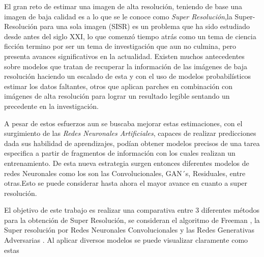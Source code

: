 
El gran reto de estimar una imagen de alta resolución, teniendo de base una imagen de baja calidad es a lo que se le conoce como 
\emph{Super Resolución},la Super-Resolución para una sola imagen (SISR) es un problema que ha sido estudiado desde antes del siglo XXI, lo que comenzó tiempo atrás
como un tema de ciencia ficción termino por ser un tema de investigación que aun no culmina, pero presenta avances significativos en la actualidad.
Existen muchos antecedentes sobre modelos que tratan de recuperar la información de las imágenes de baja resolución haciendo un escalado de esta y 
 con el uso de modelos probabilísticos estimar los datos faltantes, otros que aplican parches en combinación con imágenes de alta resolución para lograr un 
 resultado legible sentando un precedente en la investigación.
 
 A pesar de estos esfuerzos aun se buscaba mejorar estas estimaciones, con el surgimiento de las \emph{Redes Neuronales Artificiales}, capaces de realizar predicciones dada sus
habilidad de aprendizajes, podían obtener modelos precisos de una tarea especifica a partir de fragmentos de información con los cuales realizan un entrenamiento. De
esta nueva estrategia surgen entonces diferentes modelos de redes Neuronales como los son las Convolucionales, GAN´s, Residuales, entre otras.Esto 
se puede considerar hasta ahora el mayor avance en cuanto a super resolución.

El objetivo de este trabajo es realizar una comparativa entre 3 diferentes métodos para la obtención de Super Resolución, se consideran el algoritmo de Freeman \cite{freeman},
la Super resolución por Redes Neuronales Convolucionales \cite{SRCNN} y las Redes Generativas Adversarias \cite{SRGAN}. Al aplicar diversos modelos se puede 
visualizar claramente como estas
